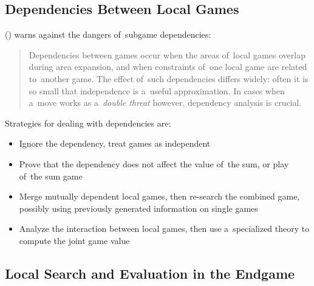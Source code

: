 \subsection{Dependencies Between Local Games}
\label{ssec:dependencies-of-subgames}

(\cite{Muller1995computer}) warns against the dangers of~subgame dependencies:

\begin{quotation} \noindent
  Dependencies between games occur when the areas of~local games overlap during area expansion, and when constraints of~one local game are related to~another game.
  The effect of~such dependencies differs widely:
  often it is so small that independence is a~useful approximation.
  In cases when a~move works as a~\emph{double threat} however, dependency analysis is crucial.
\end{quotation}

Strategies for dealing with dependencies are:
\begin{itemize}
  \item Ignore the dependency, treat games as independent
  \item Prove that the dependency does not affect the value of~the sum, or play of~the sum game
  \item Merge mutually dependent local games, then re-search the combined game, possibly using previously generated information on single games
  \item Analyze the interaction between local games, then use a~specialized theory to compute the joint game value
\end{itemize}

\subsection{Local Search and Evaluation in the Endgame}


